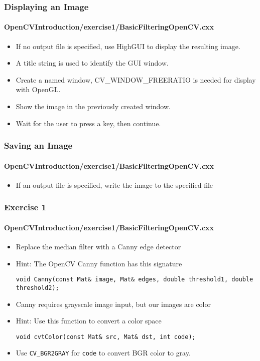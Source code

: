 \begin{frame}
\frametitle{Displaying an Image}
\framesubtitle{OpenCVIntroduction/exercise1/BasicFilteringOpenCV.cxx}
\begin{center}
\begin{itemize}
\item If no output file is specified, use HighGUI to display the resulting image.

\pause
\item A title string is used to identify the GUI window.
\item Create a named window, CV\_WINDOW\_FREERATIO is needed for display with OpenGL.
\item Show the image in the previously created window.
\item Wait for the user to press a key, then continue.
\end{itemize}
\end{center}
\end{frame}


\begin{frame}
\frametitle{Saving an Image}
\framesubtitle{OpenCVIntroduction/exercise1/BasicFilteringOpenCV.cxx}
\begin{center}
\begin{itemize}
\item If an output file is specified, write the image to the specified file

\end{itemize}
\end{center}
\end{frame}


\begin{frame}[fragile]
\frametitle{Exercise 1}
\framesubtitle{OpenCVIntroduction/exercise1/BasicFilteringOpenCV.cxx}
\begin{center}
\begin{itemize}
\item Replace the median filter with a Canny edge detector

\pause
\item Hint: The OpenCV Canny function has this signature
\begin{lstlisting}
void Canny(const Mat& image, Mat& edges, double threshold1, double threshold2);
\end{lstlisting}
\pause
\item Canny requires grayscale image input, but our images are color
\item Hint: Use this function to convert a color space
\begin{lstlisting}
void cvtColor(const Mat& src, Mat& dst, int code);
\end{lstlisting}
\item Use {\tt CV\_BGR2GRAY} for {\tt code} to convert BGR color to gray.
\end{itemize}
\end{center}
\end{frame}
